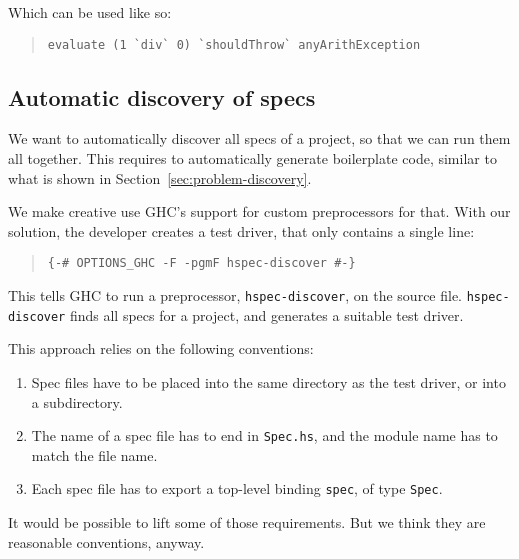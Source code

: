 \documentclass[preprint]{sigplanconf}
\begin{document}
\noindent Which can be used like so:

\begin{quote}
\small
\begin{verbatim}
evaluate (1 `div` 0) `shouldThrow` anyArithException
\end{verbatim}
\end{quote}


\subsection{Automatic discovery of specs}
\label{sec:solution-discovery}

We want to automatically discover all specs of a project, so that we
can run them all together.  This requires to automatically generate
boilerplate code, similar to what is shown in
Section~\ref{sec:problem-discovery}.

We make creative use GHC's support for custom preprocessors for
that.  With our solution, the developer creates a test driver, that only
contains a single line:

\begin{quote}
\small
\begin{verbatim}
{-# OPTIONS_GHC -F -pgmF hspec-discover #-}
\end{verbatim}
\end{quote}

\noindent This tells GHC to run a preprocessor, \verb|hspec-discover|, on the
source file.  \verb|hspec-discover| finds all specs for a project, and
generates a suitable test driver.

This approach relies on the following conventions:
\begin{enumerate}
    \item
        Spec files have to be placed into the same directory as the
        test driver, or into a subdirectory.
    \item
        The name of a spec file has to end in \verb|Spec.hs|, and the
        module name has to match the file name.
    \item
        Each spec file has to export a top-level binding \verb|spec|,
        of type \verb|Spec|.
\end{enumerate}

\noindent It would be possible to lift some of those requirements.
But we think they are reasonable conventions, anyway.


\end{document}
